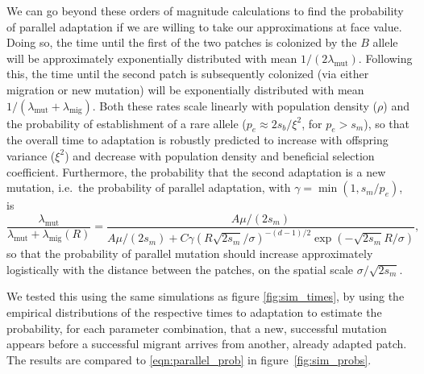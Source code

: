\documentclass{article}
\newcommand{\revpoint}[2]{}
\newcommand{\migrate}{\lambda_\text{mig}}
\newcommand{\mutrate}{\lambda_\text{mut}}
\begin{document}
We can go beyond these orders of magnitude calculations to find
the probability of parallel adaptation if we are willing to take our approximations at face value. 
Doing so, the time until the first of the two patches is colonized by the $B$
allele will be approximately exponentially distributed with mean $1/(2
\mutrate)$.
Following this, the time until the second patch is subsequently colonized 
(via either migration or new mutation) 
will be exponentially distributed with mean $1/(\mutrate+\migrate)$.
Both these rates scale linearly with population density ($\rho$) 
and the probability of establishment of a rare allele ($p_e\approx 2 s_b/\xi^2$, for $p_e>s_m$),
so that the overall time to adaptation is robustly predicted to increase with offspring variance ($\xi^2$)
and decrease with population density and beneficial selection coefficient.
Furthermore, the probability that the second adaptation is a new mutation,
i.e.\ the probability of parallel adaptation, 
with $\gamma = \min(1,s_m/p_e)$,
is 
\begin{equation} \label{eqn:parallel_prob}
    \frac{\mutrate}{\mutrate+\migrate(R)} = \frac{ A \mu / (2s_m) }{ A \mu / (2s_m) + C \gamma \left(R \sqrt{2 s_m} /\sigma \right)^{-(d-1)/2}\exp\left(- \sqrt{2 s_m} R / \sigma \right) },  
\end{equation}
so that the probability of parallel mutation should increase
approximately logistically with the distance between the patches, on the spatial scale $\sigma/\sqrt{2 s_m}$. \revpoint{2}{13}

We tested this using the same simulations as figure \ref{fig:sim_times},
by using the empirical distributions of the respective times to adaptation
to estimate the probability,
for each parameter combination,
that a new, successful mutation appears 
before a successful migrant arrives from another, already adapted patch.
The results are compared to \eqref{eqn:parallel_prob}
in figure~\ref{fig:sim_probs}.
\end{document}
